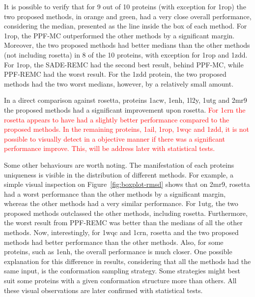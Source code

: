 It is possible to verify that for 9 out of 10 proteins (with exception for 1rop) the
two proposed methods, in orange and green, had a very close overall performance,
considering the median, presented as the line inside the box of each method.
For 1rop, the PPF-MC outperformed the other methods by a significant margin.
Moreover, the two proposed methods had better medians than
the other methods (not including rosetta) in 8 of the 10 proteins,
with exception for 1rop and 1zdd.
For 1rop, the SADE-REMC had the second best result, behind PPF-MC, while PPF-REMC
had the worst result.
For the 1zdd protein, the two proposed methods had the two worst
medians, however, by a relatively small amount.

In a direct comparison against rosetta, proteins 1acw, 1enh, 1l2y, 1utg and 2mr9
the proposed methods had a significant improvement upon rosetta.
\textcolor{red}{
For 1crn the rosetta appears to have had
a slightly better performance compared to the proposed methods.
In the remaining proteins, 1ail, 1rop, 1wqc and 1zdd, it is not
possible to visually detect in a objective manner if there was
a significant performance improve. This, will be address later with statistical
tests.
}

Some other behaviours are worth noting. The manifestation of each
proteins uniqueness is visible in the distribution of different methods. For example,
a simple visual inspection on Figure~\ref{fig:boxplot-rmsd} shows that on
2mr9, rosetta had a worst performance than the other methods by a significant margin,
whereas the other methods had a very similar performance. For 1utg, the two proposed
methods outclassed the other methods, including rosetta. Furthermore, the worst
result from PPF-REMC was better than the medians of all the other methods.
Now, interestingly, for 1wqc and 1crn, rosetta and the two proposed methods had
better performance than the other methods. Also, for some proteins, such as 1enh,
the overall performance is much closer. One possible explanation for this difference
in results, considering that all the methods had the same input, is the conformation
sampling strategy. Some strategies might best suit some proteins with a given conformation
structure more than others. All these visual observations are later confirmed with
statistical tests.

